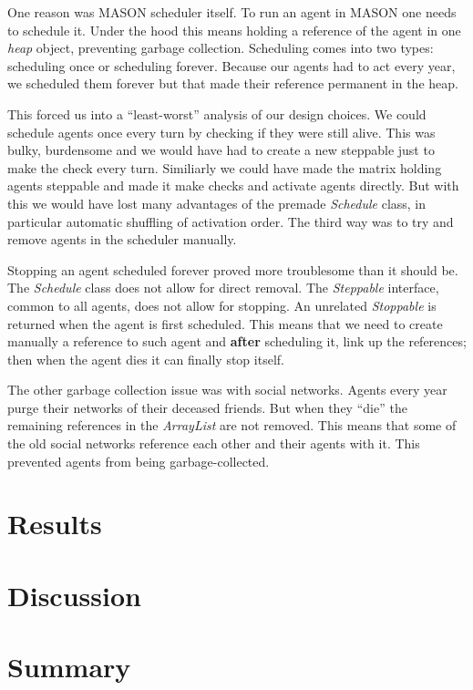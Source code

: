 \documentclass[runningheads,a4paper]{llncs}
\begin{document}
One reason was MASON scheduler itself.
To run an agent in MASON one needs to schedule it.
Under the hood this means holding a reference of the agent in one \textit{heap} object, preventing garbage collection.
Scheduling comes into two types: scheduling once or scheduling forever.
Because our agents had to act every year, we scheduled them forever but that made their reference permanent in the heap.

This forced us into a ``least-worst'' analysis of our design choices.
We could schedule agents once every turn by checking if they were still alive.
This was bulky, burdensome and we would have had to create a new steppable just to make the check every turn.
Similiarly we could have made the matrix holding agents steppable and made it make checks and activate agents directly.
But with this we would have lost many advantages of the premade \textit{Schedule} class, in particular automatic shuffling of activation order.
The third way was to try and remove agents in the scheduler manually.

Stopping an agent scheduled forever proved more troublesome than it should be.
The \textit{Schedule} class does not allow for direct removal. 
The \textit{Steppable} interface, common to all agents, does not allow for stopping.
An unrelated \textit{Stoppable} is returned when the agent is first scheduled.
This means that we need to create manually a reference to such agent and \textbf{after} scheduling it, link up the references; 
then when the agent dies it can finally stop itself.

The other garbage collection issue was with social networks.
Agents every year purge their networks of their deceased friends. 
But when they ``die'' the remaining references in the \textit{ArrayList} are not removed.
This means that some of the old social networks reference each other and their agents with it.
This prevented agents from being garbage-collected.




\section{Results}


\section{Discussion}
\section{Summary}



\end{document}

